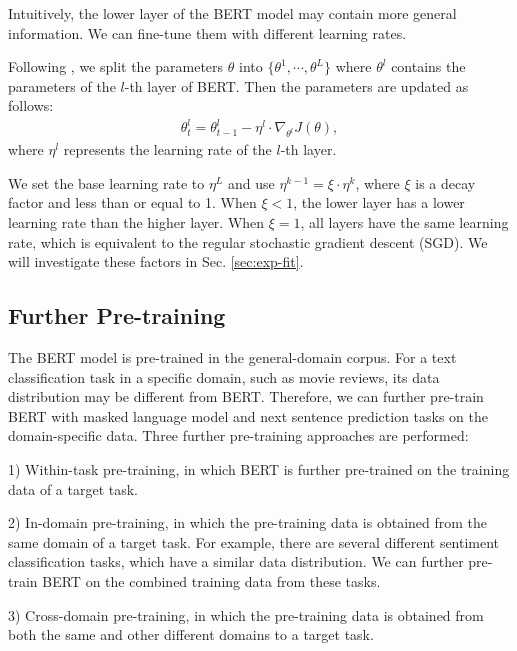\documentclass[11pt,a4paper]{article}
\theoremstyle{definition}
\begin{document}
\begin{CJK*}{UTF8}{gbsn}
Intuitively, the lower layer of the BERT model may contain more general information. We can fine-tune them with different learning rates.






Following \citet{howard2018universal}, we split the parameters $\theta$ into $\{\theta^1,\cdots,\theta^L\}$ where $\theta^l$ contains the parameters of the $l$-th layer of BERT. Then the parameters are updated as follows:
	\begin{align}	\theta^l_{t}=\theta^l_{t-1}-\eta^l\cdot\nabla_{\theta^l}J(\theta),
\label{eq:sgd}
	\end{align}
where $\eta^l$ represents the learning rate of the $l$-th layer.

We set the base learning rate to $\eta^L$ and use $\eta^{k-1}=\xi \cdot\eta^{k}$, where $\xi$ is a decay factor and less than or equal to 1.
When $\xi<1$, the lower layer has a lower learning rate than the higher layer. When $\xi=1$, all layers have the same learning rate, which is equivalent to the regular stochastic gradient descent (SGD). We will investigate these factors in Sec. \ref{sec:exp-fit}.

\subsection{Further Pre-training}


The BERT model is pre-trained in the general-domain corpus. For a text classification task in a specific domain, such as movie reviews, its data distribution may be different from BERT. Therefore, we can further pre-train BERT with masked language model and next sentence prediction tasks on the domain-specific data. Three further pre-training approaches are performed:

1) Within-task pre-training, in which BERT is further pre-trained on the training data of a target task.

2) In-domain pre-training, in which the pre-training data is obtained from the same domain of a target task. For example, there are several different sentiment classification tasks, which have a similar data distribution. We can further pre-train BERT on the combined training data from these tasks.

3) Cross-domain pre-training, in which the pre-training data is obtained from both the same and other different domains to a target task.
	







\end{CJK*}
\end{document}
